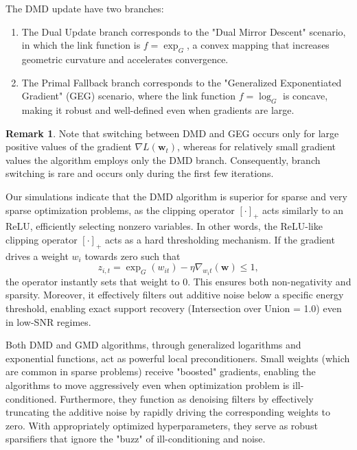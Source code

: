 \documentclass[10pt]{amsart}
\newcommand{\beq}{\begin{equation}}
\newcommand{\eeq}{\end{equation}}
\newcommand{\bw}{\boldsymbol{w}}
\theoremstyle{definition}
\newtheorem{remark}{\textbf{Remark}}
\theoremstyle{definition}	 %
\begin{document}
The DMD update have two branches:

\begin{enumerate}
\item
The Dual Update branch corresponds to the "Dual Mirror Descent" scenario, in which the link function is $f = \exp_G$, a convex mapping that increases geometric curvature and accelerates convergence.

\item


The Primal Fallback branch corresponds to the "Generalized Exponentiated Gradient" (GEG) scenario, where  the link function  $f = \log_G$ is concave, making it robust and well-defined even when gradients are large.

\end{enumerate}
\begin{remark}
Note that switching between DMD and GEG occurs only for large positive values of the gradient $\nabla L(\bw_t)$, whereas for relatively small gradient values the algorithm employs only the DMD branch. Consequently, branch switching is rare and occurs only during the first few iterations.
\end{remark}

Our simulations  indicate  that  the  DMD  algorithm is superior for sparse  and very sparse optimization problems, as the clipping operator $[\cdot]_+$ acts similarly to an  ReLU, efficiently selecting nonzero variables.   In other words,    the  ReLU-like clipping operator  $[\cdot]_+$ acts as a hard thresholding mechanism. If the gradient drives a weight $w_i$ towards zero such that
\beq
z_{i,t} =\exp_G(w_{it}) - \eta \nabla_{w_it} (\bw) \le 1,
\eeq
the operator  instantly sets that weight to $0$.  This ensures both non-negativity and sparsity. Moreover, it effectively filters out additive noise below a specific energy threshold, enabling exact support recovery (Intersection over Union = 1.0) even in low-SNR regimes.


Both DMD and GMD algorithms, through generalized logarithms and exponential functions,  act as  powerful local preconditioners. Small weights (which are common in sparse problems) receive "boosted" gradients, enabling the algorithms to move aggressively even when optimization problem is ill-conditioned. Furthermore,  they function as denoising filters by  effectively truncating the additive noise by rapidly driving the corresponding weights to zero. With appropriately optimized hyperparameters,  they serve  as robust sparsifiers that ignore the "buzz" of ill-conditioning and noise.
\end{document}

